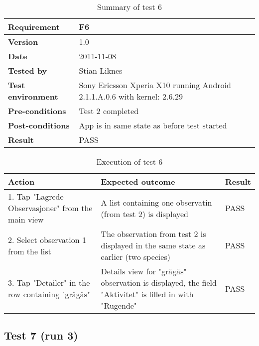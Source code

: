 	\begin{table}[htb]
		\centering
		\begin{tabular}{|p{3.5cm}|p{7.0cm}|} \hline
			\textbf{Requirement} & F6 \\ \hline
			\textbf{Version} & 1.0 \\ \hline
			\textbf{Date} & 2011-11-08 \\ \hline
			\textbf{Tested by} & Stian Liknes \\ \hline
			\textbf{Test environment} & Sony Ericsson Xperia X10 running Android 2.1.1.A.0.6 with kernel: 2.6.29 \\ \hline
			\textbf{Pre-conditions} & Test 2 completed \\ \hline
			\textbf{Post-conditions} & App is in same state as before test started \\ \hline
			\textbf{Result} & PASS \\ \hline
		\end{tabular}
		\caption{Summary of test 6}
	\end{table}

	\begin{table}[htb]
		\centering
		\begin{tabular}{|p{5.0cm}|p{5.0cm}|p{1cm}|}
			\hline \textbf{Action} & \textbf{Expected outcome} & \textbf{Result} \\ \hline
				1. Tap "Lagrede Observasjoner" from the main view &
				A list containing one observatin (from test 2) is displayed &
				PASS \\ \hline

				2. Select observation 1 from the list &
				The observation from test 2 is displayed in the same state as
				earlier (two species) &
				PASS \\ \hline

				3. Tap "Detailer" in the row containing "grågås" &
				Details view for "grågås" observation is displayed, the field "Aktivitet"
				is filled in with "Rugende" &
				PASS \\ \hline
		\end{tabular}
		\caption{Execution of test 6}
	\end{table}

\newpage
\subsection*{Test 7 (run 3)}

